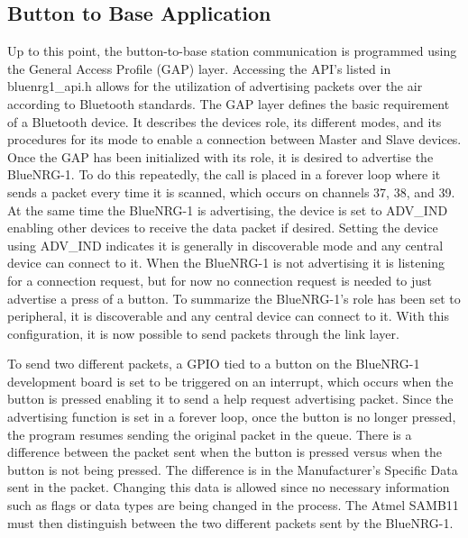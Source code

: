 \documentclass[journal]{IEEEtran}
\begin{document}
\subsection{Button to Base Application}
Up to this point, the button-to-base station communication is programmed using the General Access Profile (GAP) layer.  Accessing the API’s listed in bluenrg1\_api.h allows for the utilization of advertising packets over the air according to Bluetooth standards.  The GAP layer defines the basic requirement of a Bluetooth device.  It describes the devices role, its different modes, and its procedures for its mode to enable a connection between Master and Slave devices.  Once the GAP has been initialized with its role, it is desired to advertise the BlueNRG-1.  To do this repeatedly, the call is placed in a forever loop where it sends a packet every time it is scanned, which occurs on channels 37, 38, and 39.  At the same time the BlueNRG-1 is advertising, the device is set to ADV\_IND enabling other devices to receive the data packet if desired.  Setting the device using ADV\_IND indicates it is generally in discoverable mode and any central device can connect to it.  When the BlueNRG-1 is not advertising it is listening for a connection request, but for now no connection request is needed to just advertise a press of a button. To summarize the BlueNRG-1’s role has been set to peripheral, it is discoverable and any central device can connect to it.  With this configuration, it is now possible to send packets through the link layer.

To send two different packets, a GPIO tied to a button on the BlueNRG-1 development board is set to be triggered on an interrupt, which occurs when the button is pressed enabling it to send a help request advertising packet.  Since the advertising function is set in a forever loop, once the button is no longer pressed, the program resumes sending the original packet in the queue.  There is a difference between the packet sent when the button is pressed versus when the button is not being pressed.  The difference is in the Manufacturer’s Specific Data sent in the packet.  Changing this data is allowed since no necessary information such as flags or data types are being changed in the process.  The Atmel SAMB11 must then distinguish between the two different packets sent by the BlueNRG-1.
\end{document}
